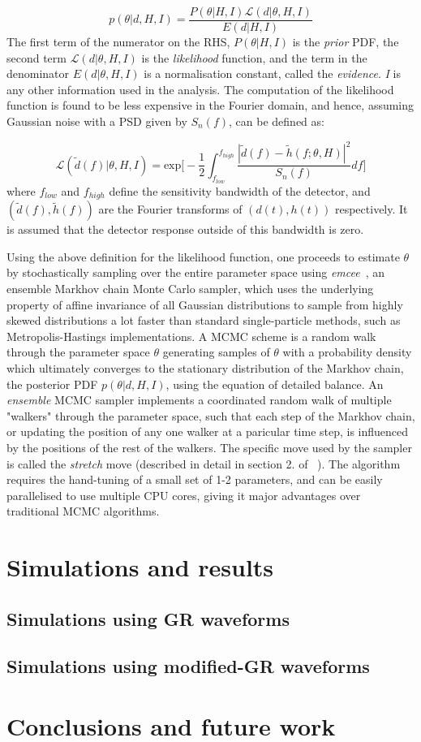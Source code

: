 \documentclass[prd,preprintnumbers,twocolumn,eqsecnum,floatfix,a4paper,nofootinbib,superscriptaddress]{revtex4}
\begin{document}
\begin{equation}
p(\theta|d, H, I) = \frac{P(\theta|H, I) \mathcal{L}(d|\theta, H, I)}{E(d|H, I)}
\label{eq:Bayes_theorem}
\end{equation} 
The first term of the numerator on the RHS, $P(\theta|H,I)$ is the \emph{prior} PDF, the second term $\mathcal{L}(d|\theta, H,I)$ is the \emph{likelihood} function, and the term in the denominator $E(d|\theta, H,I)$ is a normalisation constant, called the \emph{evidence}. \emph{I} is any other information used in the analysis. The computation of the likelihood function is found to be less expensive in the Fourier domain, and hence, assuming Gaussian noise with a PSD given by $S_n(f)$, can be defined as:

\begin{equation}
\mathcal{L}(\tilde{d}(f)|\theta, H,I) = \text{exp}\Big[ -\frac{1}{2}\int_{f_{low}}^{f_{high}} \frac{|\tilde{d}(f) - \tilde{h}(f;\theta, H)|^2}{S_n(f)}df\Big]
\end{equation}
where $f_{low}$ and $f_{high}$ define the sensitivity bandwidth of the detector, and $(\tilde{d}(f), \tilde{h}(f))$ are the Fourier transforms of $(d(t), h(t))$ respectively. It is assumed that the detector response outside of this bandwidth is zero. 

Using the above definition for the likelihood function, one proceeds to estimate $\theta$ by stochastically sampling over the entire parameter space using  \emph{emcee}~\cite{goodman2010ensemble,foreman2013emcee}, an ensemble Markhov chain Monte Carlo sampler, which uses the underlying property of affine invariance of all Gaussian distributions to sample from highly skewed distributions a lot faster than standard single-particle methods, such as Metropolis-Hastings implementations. A MCMC scheme is a random walk through the parameter space $\theta$ generating samples of $\theta$ with a probability density which ultimately converges to the stationary distribution of the Markhov chain, the posterior PDF $p(\theta|d, H, I)$, using the equation of detailed balance. An \emph{ensemble} MCMC sampler implements a coordinated random walk of multiple "walkers" through the parameter space, such that each step of the Markhov chain, or updating the position of any one walker at a paricular time step, is influenced by the positions of the rest of the walkers. The specific move used by the sampler is called the \emph{stretch} move (described in detail in section 2. of ~\cite{goodman2010ensemble}). The algorithm requires the hand-tuning of a small set of 1-2 parameters, and can be easily parallelised to use multiple CPU cores, giving it major advantages over traditional MCMC algorithms.

\section{Simulations and results}
\subsection{Simulations using GR waveforms}
\subsection{Simulations using modified-GR waveforms}
\section{Conclusions and future work}
%
%


\end{document}

